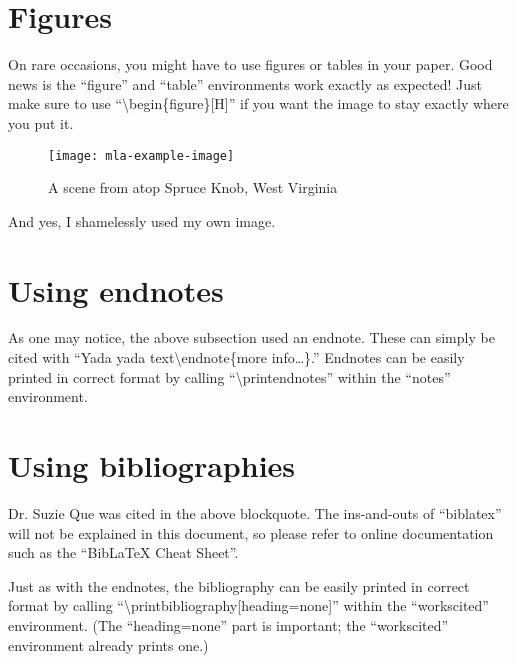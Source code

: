 \documentclass[mla7,microtype]{mla}
\begin{document}
\begin{paper}
\section{Figures}

On rare occasions, you might have to use figures or tables
in your paper.
Good news is the ``figure'' and ``table'' environments
work exactly as expected!
Just make sure to use ``\textbackslash{}begin\{figure\}[H]''
if you want the image to stay exactly where you put it.
\begin{figure}[H]
\texttt{[image: mla-example-image]}
\caption{A scene from atop Spruce Knob, West Virginia}
\end{figure}
And yes, I shamelessly used my own image.

\section{Using endnotes}

As one may notice, the above subsection used an endnote.
These can simply be cited with
``Yada yada text\textbackslash{}endnote\{more info\ldots\}.''
Endnotes can be easily printed in correct format by calling
``\textbackslash{}printendnotes'' within the
``notes'' environment.

\section{Using bibliographies}

Dr. Suzie Que was cited in the above blockquote.
The ins-and-outs of ``biblatex'' will not be explained in this
document, so please refer to online documentation such as the
``BibLaTeX Cheat Sheet''.

Just as with the endnotes,
the bibliography can be easily printed in correct format by calling
``\textbackslash{}printbibliography[heading=none]'' within the
``workscited'' environment.
(The ``heading=none'' part is important; the ``workscited'' environment
already prints one.)

\end{paper}

\begin{notes}

\printendnotes

\end{notes}

\begin{workscited}

\printbibliography[heading=none]

\end{workscited}
\end{document}

